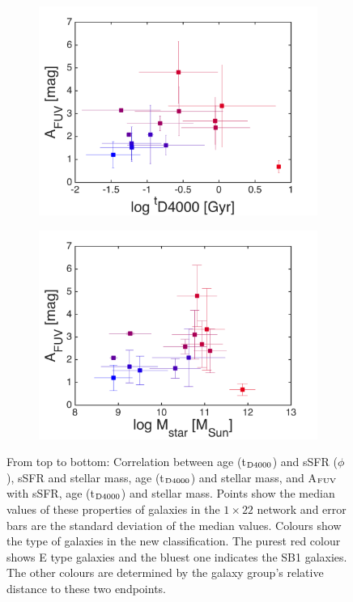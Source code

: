 \begin{figure}
\begin{subfigure}[b]{0.3\textwidth}
            \includegraphics[width=\textwidth]{images0.01/1d/f5.png}
        \end{subfigure}
       \hfill
        \begin{subfigure}[b]{0.3\textwidth}
            \includegraphics[width=\textwidth]{images0.01/1d/f6.png}
        \end{subfigure}
        \caption{From top to bottom: Correlation between age (t$_{\rm {D4000}}$) and sSFR ($\phi$), sSFR and stellar mass, age (t$_{\rm {D4000}}$) and stellar mass, and A$_{\rm {FUV}}$ with sSFR, age (t$_{\rm {D4000}}$) and stellar mass. Points show the median values of these properties of galaxies in the $1\times22$ network and error bars are the standard deviation of the median values. Colours show the type of galaxies in the new classification. The purest red colour shows E type galaxies and the bluest one indicates the SB1 galaxies. The other colours are determined by the galaxy group's relative distance to these two endpoints.}
        \label{fig: props_vs_props}
    \end{figure}
        
